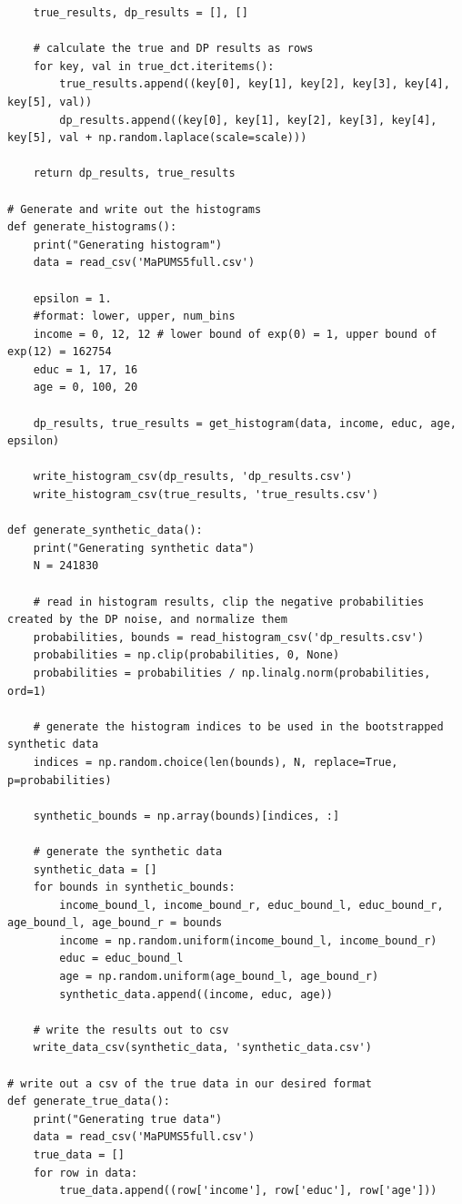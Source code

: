 \documentclass[12pt]{article}
\begin{document}
\begin{appendices}
\begin{lstlisting}
    true_results, dp_results = [], []

    # calculate the true and DP results as rows
    for key, val in true_dct.iteritems():
        true_results.append((key[0], key[1], key[2], key[3], key[4], key[5], val))
        dp_results.append((key[0], key[1], key[2], key[3], key[4], key[5], val + np.random.laplace(scale=scale)))

    return dp_results, true_results

# Generate and write out the histograms
def generate_histograms():
    print("Generating histogram")
    data = read_csv('MaPUMS5full.csv')

    epsilon = 1.
    #format: lower, upper, num_bins
    income = 0, 12, 12 # lower bound of exp(0) = 1, upper bound of exp(12) = 162754
    educ = 1, 17, 16
    age = 0, 100, 20

    dp_results, true_results = get_histogram(data, income, educ, age, epsilon)

    write_histogram_csv(dp_results, 'dp_results.csv')
    write_histogram_csv(true_results, 'true_results.csv')

def generate_synthetic_data():
    print("Generating synthetic data")
    N = 241830

    # read in histogram results, clip the negative probabilities created by the DP noise, and normalize them
    probabilities, bounds = read_histogram_csv('dp_results.csv')
    probabilities = np.clip(probabilities, 0, None)
    probabilities = probabilities / np.linalg.norm(probabilities, ord=1)

    # generate the histogram indices to be used in the bootstrapped synthetic data
    indices = np.random.choice(len(bounds), N, replace=True, p=probabilities)

    synthetic_bounds = np.array(bounds)[indices, :]

    # generate the synthetic data
    synthetic_data = []
    for bounds in synthetic_bounds:
        income_bound_l, income_bound_r, educ_bound_l, educ_bound_r, age_bound_l, age_bound_r = bounds
        income = np.random.uniform(income_bound_l, income_bound_r)
        educ = educ_bound_l
        age = np.random.uniform(age_bound_l, age_bound_r)
        synthetic_data.append((income, educ, age))

    # write the results out to csv
    write_data_csv(synthetic_data, 'synthetic_data.csv')

# write out a csv of the true data in our desired format
def generate_true_data():
    print("Generating true data")
    data = read_csv('MaPUMS5full.csv')
    true_data = []
    for row in data:
        true_data.append((row['income'], row['educ'], row['age']))


\end{lstlisting}
\end{appendices}
\end{document}

